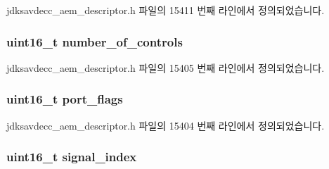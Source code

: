 jdksavdecc\+\_\+aem\+\_\+descriptor.\+h 파일의 15411 번째 라인에서 정의되었습니다.

\subsubsection[{\texorpdfstring{number\+\_\+of\+\_\+controls}{number_of_controls}}]{\setlength{\rightskip}{0pt plus 5cm}uint16\+\_\+t number\+\_\+of\+\_\+controls}\hypertarget{structjdksavdecc__descriptor__internal__port_a0104bea638bdadf1a547c2b93813e22f}{}\label{structjdksavdecc__descriptor__internal__port_a0104bea638bdadf1a547c2b93813e22f}


jdksavdecc\+\_\+aem\+\_\+descriptor.\+h 파일의 15405 번째 라인에서 정의되었습니다.

\subsubsection[{\texorpdfstring{port\+\_\+flags}{port_flags}}]{\setlength{\rightskip}{0pt plus 5cm}uint16\+\_\+t port\+\_\+flags}\hypertarget{structjdksavdecc__descriptor__internal__port_a60a1f1704542df3b3f6e6db56622ddd9}{}\label{structjdksavdecc__descriptor__internal__port_a60a1f1704542df3b3f6e6db56622ddd9}


jdksavdecc\+\_\+aem\+\_\+descriptor.\+h 파일의 15404 번째 라인에서 정의되었습니다.

\subsubsection[{\texorpdfstring{signal\+\_\+index}{signal_index}}]{\setlength{\rightskip}{0pt plus 5cm}uint16\+\_\+t signal\+\_\+index}\hypertarget{structjdksavdecc__descriptor__internal__port_ae2e81a95ee9ad83f1fe22b6a1ee29075}{}\label{structjdksavdecc__descriptor__internal__port_ae2e81a95ee9ad83f1fe22b6a1ee29075}


